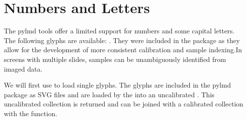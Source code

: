 \documentclass[a4paper,10pt,english,openany,oneside]{sphinxmanual}
\begin{document}
\noindent{}


\section{Numbers and Letters}
\label{\detokenize{pages/quickstart:numbers-and-letters}}
\sphinxAtStartPar
The py\sphinxhyphen{}lmd tools offer a limited support for numbers and some capital letters. The following glyphs are available: . They were included in the package as they allow for the development of more consistent calibration and sample indexing.In screens with multiple slides, samples can be unambiguously identified from imaged data.

\sphinxAtStartPar
We will first use  to load single glyphs. The glyphs are included in the py\sphinxhyphen{}lmd package as SVG files and are loaded by the  into an uncalibrated . This uncalibrated collection is returned and can be joined with a calibrated collection with the  function.

\begin{sphinxVerbatim}[commandchars=\\\{\}]
   
    
   

  \PYG{p}{[}\PYG{p}{[} \PYG{p}{]} \PYG{p}{[} \PYG{p}{]} \PYG{p}{[} \PYG{p}{]}\PYG{p}{]}
    

  
  
\end{sphinxVerbatim}
\end{document}
